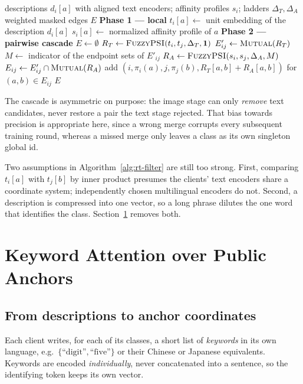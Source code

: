 \documentclass[conference]{IEEEtran}
\newcommand{\Ind}{\mathbf{1}}
\newcommand{\Mutual}{\textsc{Mutual}}
\newcommand{\FuzzyPSI}{\textsc{FuzzyPSI}}
\begin{document}
\begin{algorithm}[t]
\caption{Text candidates filtered by image affinity}
\label{alg:rt-filter}
\begin{algorithmic}[1]
\Require descriptions $d_i[a]$ with aligned text encoders; affinity profiles $s_i$; ladders $\Delta_T,\Delta_A$
\Ensure weighted masked edges $E$
  \Statex \textbf{Phase 1 --- local}
    \State $t_i[a]\gets$ unit embedding of the description $d_i[a]$
    \State $s_i[a]\gets$ normalized affinity profile of $a$ \Comment{\S\ref{sec:fuzzy}}
  \EndFor
  \Statex \textbf{Phase 2 --- pairwise cascade}
  \State $E\gets\emptyset$
    \State $R_T\gets\FuzzyPSI(t_i,t_j,\Delta_T,\Ind)$ 
    \State $E'_{ij}\gets\Mutual(R_T)$
    \State $M\gets$ indicator of the endpoint sets of $E'_{ij}$
    \State $R_A\gets\FuzzyPSI(s_i,s_j,\Delta_A,M)$ 
    \State $E_{ij}\gets E'_{ij}\cap\Mutual(R_A)$
    \State add $(i,\pi_i(a),j,\pi_j(b),R_T[a,b]+R_A[a,b])$ for $(a,b)\in E_{ij}$
  \EndFor
  \State \Return $E$
\end{algorithmic}
\end{algorithm}

The cascade is asymmetric on purpose: the image stage can only
\emph{remove} text candidates, never restore a pair the text stage
rejected. That bias towards precision is appropriate here, since a wrong
merge corrupts every subsequent training round, whereas a missed merge
only leaves a class as its own singleton global id.

Two assumptions in Algorithm~\ref{alg:rt-filter} are still too strong.
First, comparing $t_i[a]$ with $t_j[b]$ by inner product presumes the
clients' text encoders share a coordinate system; independently chosen
multilingual encoders do not. Second, a description is compressed into
one vector, so a long phrase dilutes the one word that identifies the
class. Section~\ref{sec:attn} removes both.

\section{Keyword Attention over Public Anchors}
\label{sec:attn}

\subsection{From descriptions to anchor coordinates}
Each client writes, for each of its classes, a short list of
\emph{keywords} in its own language, e.g.\
$\{\text{``digit''},\text{``five''}\}$ or
their Chinese or Japanese equivalents. Keywords are encoded
\emph{individually}, never concatenated into a sentence, so the
identifying token keeps its own vector.
\end{document}
